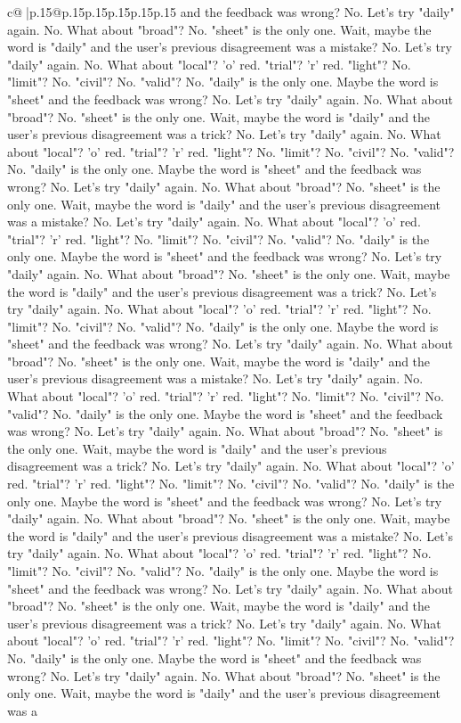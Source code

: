 \documentclass{article}
\begin{document}
{\begin{supertabular}{c@{$\;$}|p{.15\linewidth}@{}p{.15\linewidth}p{.15\linewidth}p{.15\linewidth}p{.15\linewidth}p{.15\linewidth}}
{{{and the feedback was wrong? No. Let's try "daily" again. No. What about "broad"? No. "sheet" is the only one. Wait, maybe the word is "daily" and the user's previous disagreement was a mistake? No. Let's try "daily" again. No. What about "local"? 'o' red. "trial"? 'r' red. "light"? No. "limit"? No. "civil"? No. "valid"? No. "daily" is the only one. Maybe the word is "sheet" and the feedback was wrong? No. Let's try "daily" again. No. What about "broad"? No. "sheet" is the only one. Wait, maybe the word is "daily" and the user's previous disagreement was a trick? No. Let's try "daily" again. No. What about "local"? 'o' red. "trial"? 'r' red. "light"? No. "limit"? No. "civil"? No. "valid"? No. "daily" is the only one. Maybe the word is "sheet" and the feedback was wrong? No. Let's try "daily" again. No. What about "broad"? No. "sheet" is the only one. Wait, maybe the word is "daily" and the user's previous disagreement was a mistake? No. Let's try "daily" again. No. What about "local"? 'o' red. "trial"? 'r' red. "light"? No. "limit"? No. "civil"? No. "valid"? No. "daily" is the only one. Maybe the word is "sheet" and the feedback was wrong? No. Let's try "daily" again. No. What about "broad"? No. "sheet" is the only one. Wait, maybe the word is "daily" and the user's previous disagreement was a trick? No. Let's try "daily" again. No. What about "local"? 'o' red. "trial"? 'r' red. "light"? No. "limit"? No. "civil"? No. "valid"? No. "daily" is the only one. Maybe the word is "sheet" and the feedback was wrong? No. Let's try "daily" again. No. What about "broad"? No. "sheet" is the only one. Wait, maybe the word is "daily" and the user's previous disagreement was a mistake? No. Let's try "daily" again. No. What about "local"? 'o' red. "trial"? 'r' red. "light"? No. "limit"? No. "civil"? No. "valid"? No. "daily" is the only one. Maybe the word is "sheet" and the feedback was wrong? No. Let's try "daily" again. No. What about "broad"? No. "sheet" is the only one. Wait, maybe the word is "daily" and the user's previous disagreement was a trick? No. Let's try "daily" again. No. What about "local"? 'o' red. "trial"? 'r' red. "light"? No. "limit"? No. "civil"? No. "valid"? No. "daily" is the only one. Maybe the word is "sheet" and the feedback was wrong? No. Let's try "daily" again. No. What about "broad"? No. "sheet" is the only one. Wait, maybe the word is "daily" and the user's previous disagreement was a mistake? No. Let's try "daily" again. No. What about "local"? 'o' red. "trial"? 'r' red. "light"? No. "limit"? No. "civil"? No. "valid"? No. "daily" is the only one. Maybe the word is "sheet" and the feedback was wrong? No. Let's try "daily" again. No. What about "broad"? No. "sheet" is the only one. Wait, maybe the word is "daily" and the user's previous disagreement was a trick? No. Let's try "daily" again. No. What about "local"? 'o' red. "trial"? 'r' red. "light"? No. "limit"? No. "civil"? No. "valid"? No. "daily" is the only one. Maybe the word is "sheet" and the feedback was wrong? No. Let's try "daily" again. No. What about "broad"? No. "sheet" is the only one. Wait, maybe the word is "daily" and the user's previous disagreement was a }}}
\end{supertabular}}
\end{document}
